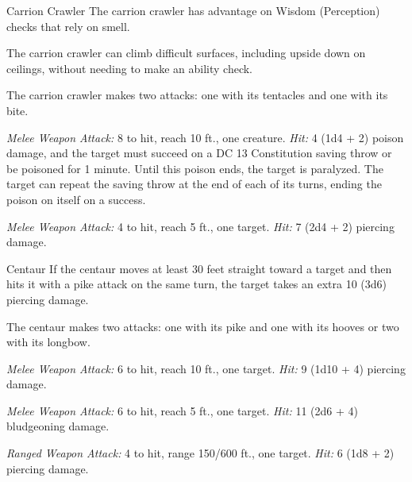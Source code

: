 \documentclass[10pt,a4paper,twoside,bg=print,twocolumn,openany,nodeprecatedcode]{dndbook}
\begin{document}
\begin{DndMonster}[float=t]{Carrion Crawler}
\DndMonsterBasics[
armor-class = {13 (natural armor)},
hit-points = {\DndDice{6d10 + 18}},
speed = {30 ft., climb 30 ft.}
]
\DndMonsterAbilityScores[
 str = 14,
 dex = 13,
 con = 16,
 int = 1,
 wis = 12,
 cha = 5
]
\DndMonsterDetails[
skills = {Perception +3},
senses = {darkvision 60 ft., passive perception 13},
challenge = 2,
]
The carrion crawler has advantage on Wisdom (Perception) checks that rely on smell.

The carrion crawler can climb difficult surfaces, including upside down on ceilings, without needing to make an ability check.

The carrion crawler makes two attacks: one with its tentacles and one with its bite.

\textsl{Melee Weapon Attack:} 8 to hit, reach 10 ft., one creature. \textsl{Hit:} 4 (1d4 + 2) poison damage, and the target must succeed on a DC 13 Constitution saving throw or be poisoned for 1 minute. Until this poison ends, the target is paralyzed. The target can repeat the saving throw at the end of each of its turns, ending the poison on itself on a success.

\textsl{Melee Weapon Attack:} 4 to hit, reach 5 ft., one target. \textsl{Hit:} 7 (2d4 + 2) piercing damage.

\end{DndMonster}



\begin{DndMonster}[float=t]{Centaur}
\DndMonsterBasics[
armor-class = {12},
hit-points = {\DndDice{6d10 + 12}},
speed = {50 ft.}
]
\DndMonsterAbilityScores[
 str = 18,
 dex = 14,
 con = 14,
 int = 9,
 wis = 13,
 cha = 11
]
\DndMonsterDetails[
skills = {Athletics +6, Perception +3, Survival +3},
languages = {Elvish, Sylvan},
challenge = 2,
]
If the centaur moves at least 30 feet straight toward a target and then hits it with a pike attack on the same turn, the target takes an extra 10 (3d6) piercing damage.

The centaur makes two attacks: one with its pike and one with its hooves or two with its longbow.

\textsl{Melee Weapon Attack:} 6 to hit, reach 10 ft., one target. \textsl{Hit:} 9 (1d10 + 4) piercing damage.

\textsl{Melee Weapon Attack:} 6 to hit, reach 5 ft., one target. \textsl{Hit:} 11 (2d6 + 4) bludgeoning damage.

\textsl{Ranged Weapon Attack:} 4 to hit, range 150/600 ft., one target. \textsl{Hit:} 6 (1d8 + 2) piercing damage.

\end{DndMonster}
\end{document}
